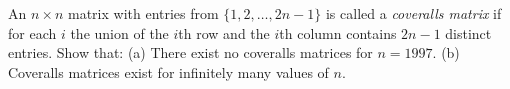 An $n \times n$ matrix with entries from $\{1, 2, \ldots, 2n-1\}$ is called a \textit{coveralls matrix} if for each $i$ the union of the $i$th row and the $i$th column contains $2n-1$ distinct entries. Show that:
(a) There exist no coveralls matrices for $n = 1997$.
(b) Coveralls matrices exist for infinitely many values of $n$.
